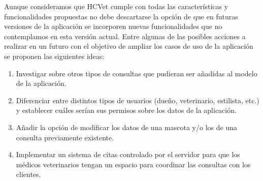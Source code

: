 \begin{recomendations}
    Aunque consideramos que HCVet cumple con todas las características y funcionalidades propuestas no debe descartarse la opción de que en futuras versiones de la aplicación se incorporen nuevas funcionalidades que no contemplamos en esta versión actual. Entre algunas de las posibles acciones a realizar en un futuro con el objetivo de ampliar los casos de uso de la aplicación se proponen las siguientes ideas:

\begin{enumerate}


\item Investigar sobre otros tipos de consultas que pudieran ser añadidas al modelo de la aplicación.

\item Diferenciar entre distintos tipos de usuarios (dueño, veterinario, estilista, etc.) y establecer cuáles serían sus permisos sobre los datos de la aplicación.

\item Añadir la opción de modificar los datos de una mascota y/o los de una consulta previamente existente.

\item Implementar un sistema de citas controlado por el servidor para que los médicos veterinarios tengan un espacio para coordinar las consultas con los clientes.
\end{enumerate}
\end{recomendations}
